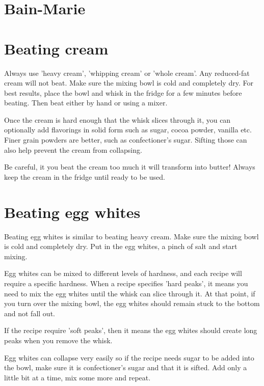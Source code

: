 \documentclass[10pt]{book}
\begin{document}
\newpage
\section*{Bain-Marie}

\newpage
\section*{Beating cream}

\indent\indent Always use 'heavy cream', 'whipping cream' or 'whole cream'. Any reduced-fat cream will not beat. Make sure the mixing bowl is cold and completely dry. For best results, place the bowl and whisk in the fridge for a few minutes before beating. Then beat either by hand or using a mixer. 

Once the cream is hard enough that the whisk slices through it, you can optionally add flavorings in solid form such as sugar, cocoa powder, vanilla etc. Finer grain powders are better, such as confectioner's sugar. Sifting those can also help prevent the cream from collapsing.

Be careful, it you beat the cream too much it will transform into butter! Always keep the cream in the fridge until ready to be used.

\newpage
\section*{Beating egg whites}

\indent\indent Beating egg whites is similar to beating heavy cream. Make sure the mixing bowl is cold and completely dry. Put in the egg whites, a pinch of salt and start mixing.

Egg whites can be mixed to different levels of hardness, and each recipe will require a specific hardness. When a recipe specifies 'hard peaks', it means you need to mix the egg whites until the whisk can slice through it. At that point, if you turn over the mixing bowl, the egg whites should remain stuck to the bottom and not fall out.

If the recipe require 'soft peaks', then it means the egg whites should create long peaks when you remove the whisk.

Egg whites can collapse very easily so if the recipe needs sugar to be added into the bowl, make sure it is confectioner's sugar and that it is sifted. Add only a little bit at a time, mix some more and repeat.
\end{document}
